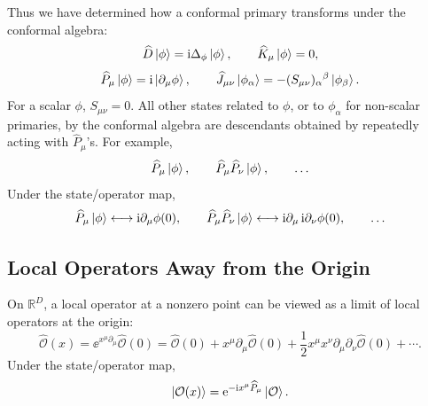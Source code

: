Thus we have determined how a conformal primary transforms under the
conformal algebra:
\[
  \widehat D\ket{\phi}
  =
  \mathrm{i}\Delta_\phi\ket{\phi},
  \qquad
  \widehat K_\mu\ket{\phi}
  =
  0,
\]
\[
  \widehat P_\mu\ket{\phi}
  =
  \mathrm{i}\ket{\partial_\mu\phi},
  \qquad
  \widehat J_{\mu\nu}\ket{\phi_\alpha}
  =
  -(S_{\mu\nu})_\alpha{}^\beta\ket{\phi_\beta}.
\]
For a scalar \(\phi\), \(S_{\mu\nu}=0\).  All other states related to
\(\phi\), or to \(\phi_\alpha\) for non-scalar primaries, by the
conformal algebra are descendants obtained by repeatedly acting with
\(\widehat P_\mu\)'s.  For example,
\[
  \widehat P_\mu\ket{\phi},
  \qquad
  \widehat P_\mu\widehat P_\nu\ket{\phi},
  \qquad \ldots
\]
Under the state/operator map,
\[
  \widehat P_\mu\ket{\phi}
  \longleftrightarrow
  \mathrm{i}\partial_\mu\phi(0),
  \qquad
  \widehat P_\mu\widehat P_\nu\ket{\phi}
  \longleftrightarrow
  \mathrm{i}\partial_\mu\,\mathrm{i}\partial_\nu\phi(0),
  \qquad \ldots
\]

\subsection{Local Operators Away from the Origin}

On \(\mathbb R^D\), a local operator at a nonzero point can be viewed as
a limit of local operators at the origin:
\[
  \widehat{\mathcal O}(x)
  =
  \ee^{x^\mu\partial_\mu}\widehat{\mathcal O}(0)
  =
  \widehat{\mathcal O}(0)
  +x^\mu\partial_\mu\widehat{\mathcal O}(0)
  +\frac12x^\mu x^\nu\partial_\mu\partial_\nu
    \widehat{\mathcal O}(0)+\cdots .
\]
Under the state/operator map,
\[
  \ket{\mathcal O(x)}
  =
  \mathrm{e}^{-\mathrm{i} x^\mu \widehat P_\mu}\ket{\mathcal O}.
\]

